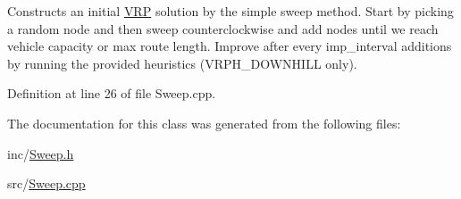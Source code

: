 Constructs an initial \hyperlink{class_v_r_p}{VRP} solution by the simple sweep method. Start by picking a random node and then sweep counterclockwise and add nodes until we reach vehicle capacity or max route length. Improve after every imp\_\-interval additions by running the provided heuristics (VRPH\_\-DOWNHILL only).



Definition at line 26 of file Sweep.cpp.



The documentation for this class was generated from the following files:\begin{DoxyCompactItemize}
\item 
inc/\hyperlink{_sweep_8h}{Sweep.h}\item 
src/\hyperlink{_sweep_8cpp}{Sweep.cpp}\end{DoxyCompactItemize}
